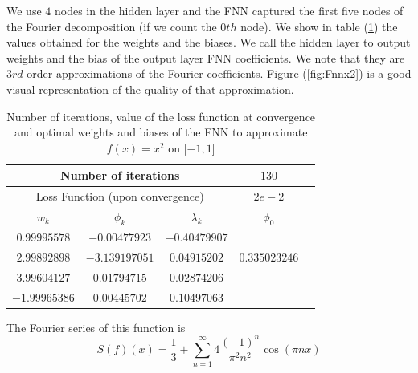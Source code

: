 \documentclass[AMS,STIX1COL]{WileyNJD-v2}
\begin{document}
We use $4$ nodes in the hidden layer and the FNN captured the first five nodes of the Fourier decomposition (if we count the $0th$ node). We show in table (\ref{tab:tabfnnx2}) the values obtained for the weights and the biases. We call the hidden layer to output weights and the bias of the output layer FNN coefficients. We note that they are $3rd$ order approximations of the Fourier coefficients. Figure (\ref{fig:Fnnx2}) is a good visual representation of the quality of that approximation.
\begin{table}[!h]
  \begin{center}
  \begin{tabular}{ |c|c|c|c|c| } 
    \hline
\multicolumn{3}{|c|}{Number of iterations}& $130$  \\
\hline
  \multicolumn{3}{|c|}{Loss Function (upon convergence)} & $2e-2$  \\
\hline
\hline
$w_k$ & $\phi_k$ & $\lambda_k$& $\phi_0$ \\
\hline
$0.99995578$ & $-0.00477923$ &$-0.40479907$& \\ 
$2.99892898$&$-3.139197051$ & $0.04915202$& $0.335023246$ \\ 
$3.99604127$& $0.01794715$ & $0.02874206$& \\ 
$ -1.99965386$& $0.00445702$ & $ 0.10497063$& \\ 
\hline
\end{tabular}
\caption{\;Number of iterations, value of the loss function at convergence and optimal weights and biases of the FNN to approximate $ f(x) = x^2$ on $[-1, 1$]}\label{tab:tabfnnx2}
\end{center}
\end{table}
The Fourier series of this function is
$$
S(f)(x)= \frac{1}{3} + \sum_{n=1}^{\infty} 4 \frac{(-1)^n}{\pi^2 n^2} \cos(\pi nx)
$$
\end{document}
